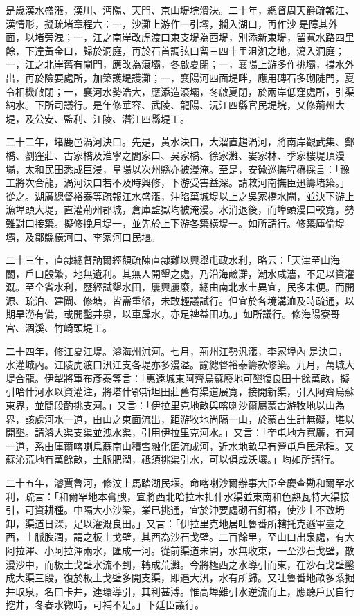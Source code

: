 \begin{pinyinscope}
是歲漢水盛漲，漢川、沔陽、天門、京山堤垸潰決。二十年，總督周天爵疏報江、漢情形，擬疏堵章程六：一，沙灘上游作一引壩，攔入湖口，再作沙是障其外面，以堵旁洩；一，江之南岸改虎渡口東支堤為西堤，別添新東堤，留寬水路四里餘，下達黃金口，歸於洞庭，再於石首調弦口留三四十里沮洳之地，瀉入洞庭；一，江之北岸舊有閘門，應改為滾壩，冬啟夏閉；一，襄陽上游多作挑壩，撐水外出，再於險要處所，加築護堤護灘；一，襄陽河四面堤畔，應用磚石多砌陡門，夏令相機啟閉；一，襄河水勢浩大，應添造滾壩，冬啟夏閉，於兩岸低窪處所，引渠納水。下所司議行。是年修華容、武陵、龍陽、沅江四縣官民堤垸，又修荊州大堤，及公安、監利、江陵、潛江四縣堤工。

二十二年，堵鹿邑渦河決口。先是，黃水決口，大溜直趨渦河，將南岸觀武集、鄭橋、劉窪莊、古家橋及淮寧之閻家口、吳家橋、徐家灘、婁家林、季家樓堤頂漫塌，太和民田悉成巨浸，阜陽以次州縣亦被漫淹。至是，安徽巡撫程楙採言：「豫工將次合龍，渦河決口若不及時興修，下游受害益深。請敕河南撫臣迅籌堵築。」從之。湖廣總督裕泰等疏報江水盛漲，沖陷萬城堤以上之吳家橋水閘，並決下游上漁埠頭大堤，直灌荊州郡城，倉庫監獄均被淹漫。水消退後，而埠頭漫口較寬，勢難對口接築。擬修挽月堤一，並先於上下游各築橫堤一。如所請行。修築庫倫堤壩，及鄒縣橫河口、李家河口民堰。

二十三年，直隸總督訥爾經額疏陳直隸難以興舉屯政水利，略云：「天津至山海關，戶口殷繁，地無遺利。其無人開墾之處，乃沿海鹼灘，潮水咸濇，不足以資灌溉。至全省水利，歷經試墾水田，屢興屢廢，總由南北水土異宜，民多未便。而開源、疏泊、建閘、修塘，皆需重帑，未敢輕議試行。但宜於各境溝洫及時疏通，以期旱澇有備，或開鑿井泉，以車戽水，亦足裨益田功。」如所議行。修海陽寮哥宮、涸溪、竹崎頭堤工。

二十四年，修江夏江堤。濬海州沭河。七月，荊州江勢汎漲，李家埠內是決口，水灌城內。江陵虎渡口汛江支各堤亦多漫溢。諭總督裕泰籌款修築。九月，萬城大堤合龍。伊犁將軍布彥泰等言：「惠遠城東阿齊烏蘇廢地可墾復良田十餘萬畝，擬引哈什河水以資灌注，將塔什鄂斯坦田莊舊有渠道展寬，接開新渠，引入阿齊烏蘇東界，並間段酌挑支河。」又言：「伊拉里克地畝與喀喇沙爾屬蒙古游牧地以山為界，該處河水一道，由山之東面流出，距游牧地尚隔一山，於蒙古生計無礙，堪以開墾。請濬大渠支渠並洩水渠，引用伊拉里克河水。」又言：「奎屯地方寬廣，有河一道，系由庫爾喀喇烏蘇南山積雪融化匯流成河，近水地畝早有營屯戶民承種。又蘇沁荒地有萬餘畝，土脈肥潤，祗須挑渠引水，可以俱成沃壤。」均如所請行。

二十五年，濬賈魯河，修汶上馬踏湖民堰。命喀喇沙爾辦事大臣全慶查勘和爾罕水利，疏言：「和爾罕地本膏腴，宜將西北哈拉木扎什水渠並東南和色熱瓦特大渠接引，可資耕種。中隔大小沙梁，業已挑通，宜於沖要處砌石釘椿，使沙土不致坍卸，渠道日深，足以灌溉良田。」又言：「伊拉里克地居吐魯番所轄托克遜軍臺之西，土脈腴潤，謂之板土戈壁，其西為沙石戈壁。二百餘里，至山口出泉處，有大阿拉渾、小阿拉渾兩水，匯成一河。從前渠道未開，水無收束，一至沙石戈壁，散漫沙中，而板土戈壁水流不到，轉成荒灘。今將極西之水導引而東，在沙石戈壁鑿成大渠三段，復於板土戈壁多開支渠，即遇大汛，水有所歸。又吐魯番地畝多系掘井取泉，名曰卡井，連環導引，其利甚溥。惟高埠難引水逆流而上，應聽戶民自行挖井，冬春水微時，可補不足。」下廷臣議行。


\end{pinyinscope}
